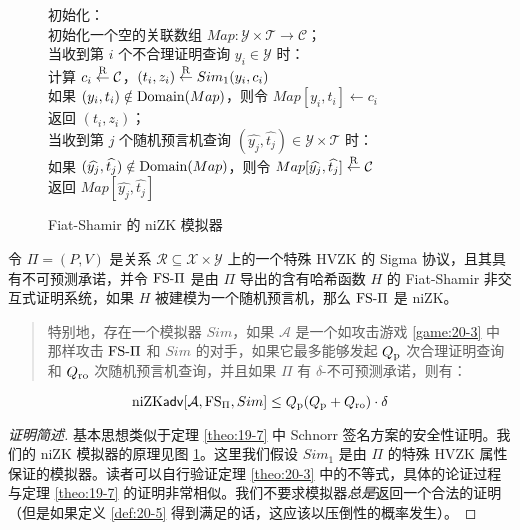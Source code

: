 \begin{figure}
  \hspace*{95pt} 初始化：\\
  \hspace*{120pt} 初始化一个空的关联数组 $Map:\mathcal{Y}\times\mathcal{T}\to\mathcal{C}$；\\
  \hspace*{95pt} 当收到第 $i$ 个不合理证明查询 $y_i\in\mathcal{Y}$ 时：\\
  \hspace*{120pt} 计算 $c_i\overset{\rm R}\leftarrow\mathcal{C}$，$(t_i,z_i)\overset{\rm R}\leftarrow Sim_1(y_i,c_i)$\\
  \hspace*{120pt} 如果 $(y_i,t_i)\notin{\rm Domain}(Map)$，则令 $Map[y_i,t_i]\leftarrow c_i$\\
  \hspace*{120pt} 返回 $(t_i,z_i)$；\\
  \hspace*{95pt} 当收到第 $j$ 个随机预言机查询 $(\widehat{y_j},\widehat{t_j})\in\mathcal{Y}\times\mathcal{T}$ 时：\\
  \hspace*{120pt} 如果 $(\widehat{y_j},\widehat{t_j})\notin{\rm Domain}(Map)$，则令 $Map[\widehat{y_j},\widehat{t_j}]\overset{\rm R}\leftarrow\mathcal{C}$\\
  \hspace*{120pt} 返回 $Map[\widehat{y_j},\widehat{t_j}]$
  \caption{Fiat-Shamir 的 niZK 模拟器}
  \label{fig:20-2}
\end{figure}

\begin{theorem}\label{theo:20-3}
令 $\Pi=(P,V)$ 是关系 $\mathcal{R}\subseteq\mathcal{X}\times\mathcal{Y}$ 上的一个特殊 HVZK 的 Sigma 协议，且其具有不可预测承诺，并令 ${\rm FS}\text{-}\Pi$ 是由 $\Pi$ 导出的含有哈希函数 $H$ 的 Fiat-Shamir 非交互式证明系统，如果 $H$ 被建模为一个随机预言机，那么 ${\rm FS}\text{-}\Pi$ 是 niZK。
\begin{quote}
特别地，存在一个模拟器 $Sim$，如果 $\mathcal{A}$ 是一个如攻击游戏 \ref{game:20-3} 中那样攻击 ${\rm FS}\text{-}\Pi$ 和 $Sim$ 的对手，如果它最多能够发起 $Q_{\rm p}$ 次合理证明查询和 $Q_{\rm ro}$ 次随机预言机查询，并且如果 $\Pi$ 有 $\delta$-不可预测承诺，则有：
\end{quote}
\begin{equation}
{\rm niZK\mathsf{adv}}[\mathcal{A},{\rm FS}_\Pi,Sim]\leq Q_{\rm p}(Q_{\rm p}+Q_{\rm ro})\cdot\delta
\end{equation}
\end{theorem}

\begin{proof}[证明简述]
基本思想类似于定理 \ref{theo:19-7} 中 Schnorr 签名方案的安全性证明。我们的 niZK 模拟器的原理见图 \ref{fig:20-2}。这里我们假设 $Sim_1$ 是由 $\Pi$ 的特殊 HVZK 属性保证的模拟器。读者可以自行验证定理 \ref{theo:20-3} 中的不等式，具体的论证过程与定理 \ref{theo:19-7} 的证明非常相似。我们不要求模拟器\emph{总是}返回一个合法的证明（但是如果定义 \ref{def:20-5} 得到满足的话，这应该以压倒性的概率发生）。
\end{proof}